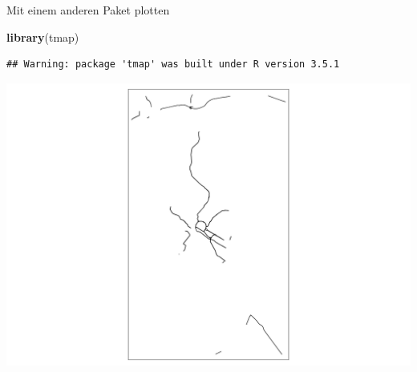 \documentclass[ignorenonframetext,]{beamer}
\newenvironment{Shaded}{\begin{snugshade}}{\end{snugshade}}
\newcommand{\KeywordTok}[1]{\textcolor[rgb]{0.26,0.66,0.93}{\textbf{#1}}}
\newcommand{\NormalTok}[1]{\textcolor[rgb]{0.74,0.68,0.62}{#1}}
\newcommand{\OperatorTok}[1]{\textcolor[rgb]{0.74,0.68,0.62}{#1}}
\begin{document}
\begin{frame}[fragile]{Mit einem anderen Paket plotten}
\protect\hypertarget{mit-einem-anderen-paket-plotten}{}

\begin{Shaded}
\begin{Highlighting}[]
\KeywordTok{library}\NormalTok{(tmap)}
\end{Highlighting}
\end{Shaded}

\begin{verbatim}
## Warning: package 'tmap' was built under R version 3.5.1
\end{verbatim}

\begin{Shaded}
\end{Shaded}

\includegraphics{B3_osm_mainapi_files/figure-beamer/unnamed-chunk-34-1.pdf}

\end{frame}
\end{document}
